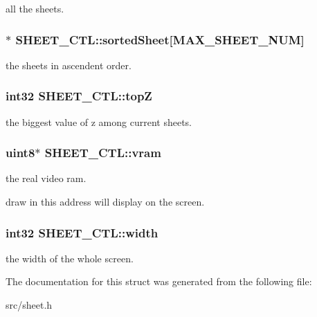 all the sheets. 

\hypertarget{struct_s_h_e_e_t___c_t_l_a2a5cb880dfb60f67ff6199210d6541e3}{}
\subsubsection[{sorted\+Sheet}]{$\ast$ S\+H\+E\+E\+T\+\_\+\+C\+T\+L\+::sorted\+Sheet\mbox{[}M\+A\+X\+\_\+\+S\+H\+E\+E\+T\+\_\+\+N\+U\+M\mbox{]}}\label{struct_s_h_e_e_t___c_t_l_a2a5cb880dfb60f67ff6199210d6541e3}


the sheets in ascendent order. 

\hypertarget{struct_s_h_e_e_t___c_t_l_a9c553d8295dd7a77fbee4f8a2e019a5e}{}
\subsubsection[{top\+Z}]{\setlength{\rightskip}{0pt plus 5cm}int32 S\+H\+E\+E\+T\+\_\+\+C\+T\+L\+::top\+Z}\label{struct_s_h_e_e_t___c_t_l_a9c553d8295dd7a77fbee4f8a2e019a5e}


the biggest value of z among current sheets. 

\hypertarget{struct_s_h_e_e_t___c_t_l_a2d8f8732b3dddffe2ada89ed06c8c4a2}{}
\subsubsection[{vram}]{\setlength{\rightskip}{0pt plus 5cm}uint8$\ast$ S\+H\+E\+E\+T\+\_\+\+C\+T\+L\+::vram}\label{struct_s_h_e_e_t___c_t_l_a2d8f8732b3dddffe2ada89ed06c8c4a2}


the real video ram. 

draw in this address will display on the screen. \hypertarget{struct_s_h_e_e_t___c_t_l_a4a80677c76f07b597e276272bbace4d3}{}
\subsubsection[{width}]{\setlength{\rightskip}{0pt plus 5cm}int32 S\+H\+E\+E\+T\+\_\+\+C\+T\+L\+::width}\label{struct_s_h_e_e_t___c_t_l_a4a80677c76f07b597e276272bbace4d3}


the width of the whole screen. 



The documentation for this struct was generated from the following file\+:\begin{DoxyCompactItemize}
\item 
src/sheet.\+h\end{DoxyCompactItemize}
